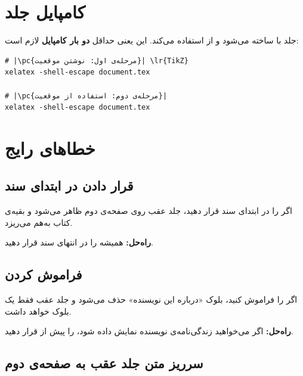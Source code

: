
\section{کامپایل جلد}
\label{sec:cover-compile}

جلد  با  ساخته می‌شود و
از  استفاده می‌کند.
این یعنی حداقل \textbf{دو بار کامپایل} لازم است:

\begin{latin}
\begin{verbatim}
# |\pc{مرحله‌ی اول: نوشتن موقعیت}| \lr{TikZ}
xelatex -shell-escape document.tex

# |\pc{مرحله‌ی دوم: استفاده از موقعیت}|
xelatex -shell-escape document.tex
\end{verbatim}
\end{latin}


\section{خطاهای رایج}
\label{sec:cover-mistakes}

\subsection{قرار دادن  در ابتدای سند}
\label{sec:cover-mistake-position}

اگر  را در ابتدای سند قرار
دهید، جلد عقب روی صفحه‌ی دوم ظاهر می‌شود و
بقیه‌ی کتاب به‌هم می‌ریزد.

\textbf{راه‌حل:} همیشه  را در
انتهای سند قرار دهید.

\subsection{فراموش کردن }
\label{sec:cover-mistake-authorbio}

اگر  را فراموش کنید، بلوک «درباره
این نویسنده» حذف می‌شود و جلد عقب فقط یک بلوک
خواهد داشت.

\textbf{راه‌حل:} اگر می‌خواهید زندگی‌نامه‌ی نویسنده
نمایش داده شود،  را پیش از
 قرار دهید.

\subsection{سرریز متن جلد عقب به صفحه‌ی دوم}
\label{sec:cover-mistake-overflow}

